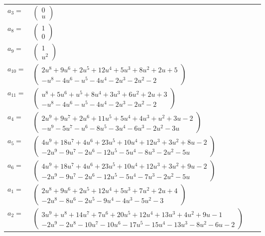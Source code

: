 \documentclass[1p]{elsarticle_modified}
\theoremstyle{definition}
\begin{document}
\begin{tabular}{m{7pt} m{180pt} m{7pt} m{180pt} }
\flushright $a_{3}=$&$\begin{pmatrix}0\\u\end{pmatrix}$ \\
\flushright $a_{8}=$&$\begin{pmatrix}1\\0\end{pmatrix}$ \\
\flushright $a_{9}=$&$\begin{pmatrix}1\\u^2\end{pmatrix}$ \\
\flushright $a_{10}=$&$\begin{pmatrix}2 u^8+9 u^6+2 u^5+12 u^4+5 u^3+8 u^2+2 u+5\\- u^8-4 u^6- u^5-4 u^4-2 u^3-2 u^2-2\end{pmatrix}$ \\
\flushright $a_{11}=$&$\begin{pmatrix}u^8+5 u^6+u^5+8 u^4+3 u^3+6 u^2+2 u+3\\- u^8-4 u^6- u^5-4 u^4-2 u^3-2 u^2-2\end{pmatrix}$ \\
\flushright $a_{4}=$&$\begin{pmatrix}2 u^9+9 u^7+2 u^6+11 u^5+5 u^4+4 u^3+u^2+3 u-2\\- u^9-5 u^7- u^6-8 u^5-3 u^4-6 u^3-2 u^2-3 u\end{pmatrix}$ \\
\flushright $a_{5}=$&$\begin{pmatrix}4 u^9+18 u^7+4 u^6+23 u^5+10 u^4+12 u^3+3 u^2+8 u-2\\-2 u^9-9 u^7-2 u^6-12 u^5-5 u^4-8 u^3-2 u^2-5 u\end{pmatrix}$ \\
\flushright $a_{6}=$&$\begin{pmatrix}4 u^9+18 u^7+4 u^6+23 u^5+10 u^4+12 u^3+3 u^2+9 u-2\\-2 u^9-9 u^7-2 u^6-12 u^5-5 u^4-7 u^3-2 u^2-5 u\end{pmatrix}$ \\
\flushright $a_{1}=$&$\begin{pmatrix}2 u^8+9 u^6+2 u^5+12 u^4+5 u^3+7 u^2+2 u+4\\-2 u^8-8 u^6-2 u^5-9 u^4-4 u^3-5 u^2-3\end{pmatrix}$ \\
\flushright $a_{2}=$&$\begin{pmatrix}3 u^9+u^8+14 u^7+7 u^6+20 u^5+12 u^4+13 u^3+4 u^2+9 u-1\\-2 u^9-2 u^8-10 u^7-10 u^6-17 u^5-15 u^4-13 u^3-8 u^2-6 u-2\end{pmatrix}$ \\

\end{tabular}
\end{document}
